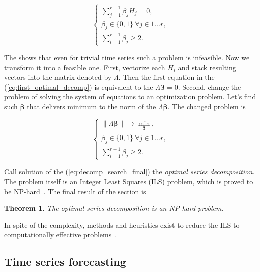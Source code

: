 \documentclass[referee, pdflatex, sn-mathphys-num]{sn-jnl}
\theoremstyle{definition}
\theoremstyle{plain}
\newtheorem{Th}{Theorem}
\begin{document}
	\begin{equation}\label{eq:first_optimal_decomp}
		\begin{cases*}
			\sum\limits_{j = 1}^{r - 1} \beta_j H_j = 0, \\
			\beta_j \in \{0, 1\} \ \forall j \in 1 \ldots r, \\
			\sum\limits_{i = 1}^{r - 1} \beta_j \ge 2.
		\end{cases*}
	\end{equation}
	
	The \cite{ecfb9dc578be43ae9ee8fc88b8ff9151} shows that even for trivial time series such a problem is infeasible. Now we transform it into a feasible one. First, vectorize each $ H_i $ and stack resulting vectors into the matrix denoted by $ \Lambda $. Then the first equation in the (\ref{eq:first_optimal_decomp}) is equivalent to the $ \Lambda \boldsymbol{\beta} = 0 $. Second, change the problem of solving the system of equations to an optimization problem. Let's find such $ \boldsymbol{\beta} $ that delivers minimum to the norm of the $ \Lambda \boldsymbol{\beta} $. The changed problem is
	
	\begin{equation}\label{eq:decomp_search_final}
		\begin{cases*}
			\lVert \Lambda \boldsymbol{\beta} \rVert \to \underset{\boldsymbol{\beta}}{\min}, \\
			\beta_j \in \{0, 1\} \ \forall j \in 1 \ldots r, \\
			\sum\limits_{i = 1}^{r - 1} \beta_j \ge 2.
		\end{cases*}
	\end{equation}
	
	Call solution of the (\ref{eq:decomp_search_final}) the \emph{optimal series decomposition}. The problem itself is an Integer Least Squares (ILS) problem, which is proved to be NP-hard~\cite{van1981another}. The final result of the section is
	
	\begin{Th}
		The optimal series decomposition is an NP-hard problem.
	\end{Th}
	
	In spite of the complexity, methods and heuristics exist to reduce the ILS to computationally effective problems~\cite{Grafarend2022}.
	
	\subsection{Time series forecasting}\label{sec:tssa_forecast}
	
\end{document}
